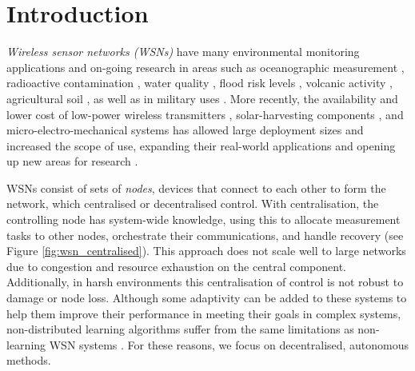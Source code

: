 \section{Introduction}

\textit{Wireless sensor networks (WSNs)} have many environmental monitoring applications and on-going research in areas such as oceanographic measurement \citep{Mahdy2008a, Albaladejo2010, 6973877}, radioactive contamination \citep{Gomez2015}, water quality \citep{Fang2010}, flood risk levels \citep{Castillo2004}, volcanic activity \citep{Werner-Allen2006}, agricultural soil \citep{8745854}, as well as in military uses \citep{6268958}. More recently, the availability and lower cost of low-power wireless transmitters \citep{902661}, solar-harvesting components \citep{Prauzek2018}, and micro-electro-mechanical systems \citep{1045391} has allowed large deployment sizes and increased the scope of use, expanding their real-world applications and opening up new areas for research \citep{5597912, Kandris2020}.

WSNs consist of sets of \textit{nodes}, devices that connect to each other to form the network, which centralised or decentralised control. With centralisation, the controlling node has system-wide knowledge, using this to allocate measurement tasks to other nodes, orchestrate their communications, and handle recovery (see Figure \ref{fig:wsn_centralised}). This approach does not scale well to large networks due to congestion and resource exhaustion on the central component. Additionally, in harsh environments this centralisation of control is not robust to damage or node loss. Although some adaptivity can be added to these systems to help them improve their performance in meeting their goals in complex systems, non-distributed learning algorithms suffer from the same limitations as non-learning WSN systems \citep{Imagestate2006}. For these reasons, we focus on decentralised, autonomous methods.

